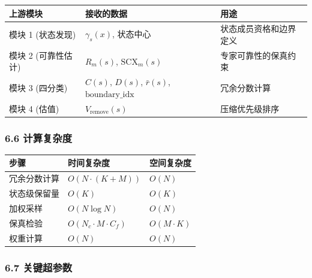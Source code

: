 \documentclass[
  12pt,
]{ctexart}
\begin{document}
\begin{longtable}[]{@{}
  >{\raggedright\arraybackslash}p{}
  >{\raggedright\arraybackslash}p{}
  >{\raggedright\arraybackslash}p{}@{}}
\toprule\noalign{}
\begin{minipage}[b]{\linewidth}\raggedright
上游模块
\end{minipage} & \begin{minipage}[b]{\linewidth}\raggedright
接收的数据
\end{minipage} & \begin{minipage}[b]{\linewidth}\raggedright
用途
\end{minipage} \\
\midrule\noalign{}
\endhead
\bottomrule\noalign{}
\endlastfoot
模块 1 (状态发现) & \(\gamma_s(x)\), 状态中心 &
状态成员资格和边界定义 \\
模块 2 (可靠性估计) & \(R_m(s)\), \(\text{SCX}_m(s)\) &
专家可靠性的保真约束 \\
模块 3 (四分类) & \(C(s)\), \(D(s)\), \(\bar{r}(s)\),
\(\text{boundary\_idx}\) & 冗余分数计算 \\
模块 4 (估值) & \(V_{\text{remove}}(s)\) & 压缩优先级排序 \\
\end{longtable}

\subsubsection{6.6 计算复杂度}\label{ux8ba1ux7b97ux590dux6742ux5ea6-5}

\begin{longtable}[]{@{}lll@{}}
\toprule\noalign{}
步骤 & 时间复杂度 & 空间复杂度 \\
\midrule\noalign{}
\endhead
\bottomrule\noalign{}
\endlastfoot
冗余分数计算 & \(O(N \cdot (K + M))\) & \(O(N)\) \\
状态级保留量 & \(O(K)\) & \(O(K)\) \\
加权采样 & \(O(N \log N)\) & \(O(N)\) \\
保真检验 & \(O(N_c \cdot M \cdot C_f)\) & \(O(M \cdot K)\) \\
权重计算 & \(O(N)\) & \(O(N)\) \\
\end{longtable}

\subsubsection{6.7 关键超参数}\label{ux5173ux952eux8d85ux53c2ux6570-5}
\end{document}
